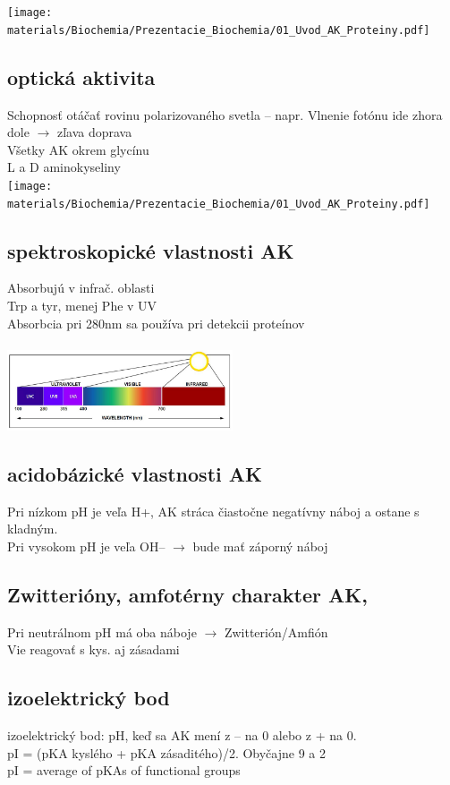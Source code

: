\texttt{[image: materials/Biochemia/Prezentacie\_Biochemia/01\_Uvod\_AK\_Proteiny.pdf]}
\\
\subsection{optická aktivita}
Schopnosť otáčať rovinu polarizovaného svetla -- napr. Vlnenie fotónu ide zhora dole $\rightarrow$ zľava doprava\\
Všetky AK okrem glycínu\\
L a D aminokyseliny \\

\texttt{[image: materials/Biochemia/Prezentacie\_Biochemia/01\_Uvod\_AK\_Proteiny.pdf]}
\\
\subsection{spektroskopické vlastnosti AK}
Absorbujú v infrač. oblasti\\
Trp a tyr, menej Phe v UV\\
Absorbcia pri 280nm sa používa pri detekcii proteínov\\
\\
\includegraphics[width=0.5\textwidth]{images/biochemia/wavelength}
\\
\subsection{acidobázické vlastnosti AK}
Pri nízkom pH je veľa H+, AK stráca čiastočne negatívny náboj a ostane s kladným. \\
Pri vysokom pH je veľa OH-- $\rightarrow$ bude mať záporný náboj\\
\subsection{Zwitterióny, amfotérny charakter AK, }
Pri neutrálnom pH má oba náboje $\rightarrow$ Zwitterión/Amfión\\
Vie reagovať s kys. aj zásadami\\
\subsection{izoelektrický bod}
izoelektrický bod: pH, keď sa AK mení z -- na 0 alebo z + na 0.\\
\tab pI = (pKA kyslého + pKA zásaditého)/2. Obyčajne 9 a 2\\
\tab pI = average of pKAs of functional groups
